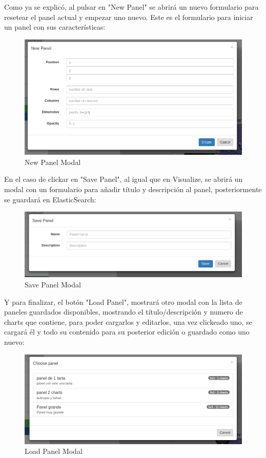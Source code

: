\documentclass[a4paper, 12pt]{book}
\begin{document}
Como ya se explicó, al pulsar en "New Panel" se abrirá un nuevo formulario para resetear el panel actual y empezar uno nuevo. Este es el formulario para iniciar un panel con sus características:

\begin{figure}[H]
  \centering
  \includegraphics[width=16cm, keepaspectratio]{img/development/newpanelmodal}
  \caption{New Panel Modal}
  \label{fig:newpanelmodal}
\end{figure}

En el caso de clickar en "Save Panel", al igual que en Visualize, se abrirá un modal con un formulario para añadir título y descripción al panel, posteriormente se guardará en ElasticSearch:

\begin{figure}[H]
  \centering
  \includegraphics[width=16cm, keepaspectratio]{img/development/savepanelmodal}
  \caption{Save Panel Modal}
  \label{fig:savepanelmodal}
\end{figure}

Y para finalizar, el botón "Load Panel", mostrará otro modal con la lista de paneles guardados disponibles, mostrando el título/descripción y numero de charts que contiene, para poder cargarlos y editarlos, una vez clickeado uno, se cargará él y todo su contenido para su posterior edición o guardado como uno nuevo:

\begin{figure}[H]
  \centering
  \includegraphics[width=16cm, keepaspectratio]{img/development/loadpanelmodal}
  \caption{Load Panel Modal}
  \label{fig:loadpanelmodal}
\end{figure}
\end{document}
